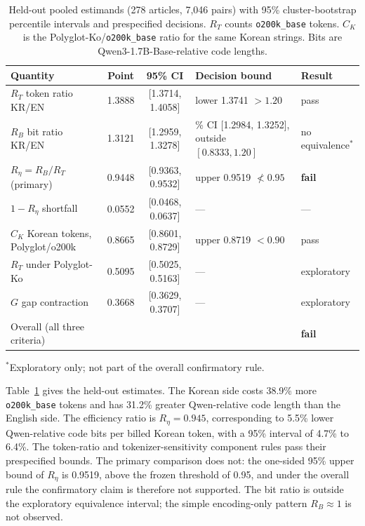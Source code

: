 \documentclass[11pt,a4paper]{article}
\newcommand{\RT}{R_{T}}
\newcommand{\RB}{R_{B}}
\newcommand{\Reta}{R_{\eta}}
\newcommand{\CK}{C_{K}}
\begin{document}
\begin{table}[htbp]
\centering\small
\caption{Held-out pooled estimands (278 articles, 7{,}046 pairs) with 95\%
cluster-bootstrap percentile intervals and prespecified decisions.
$\RT$ counts \texttt{o200k\_base} tokens. $\CK$ is the
Polyglot-Ko/\texttt{o200k\_base} ratio for the same Korean strings.
Bits are Qwen3-1.7B-Base-relative code lengths.}
\label{tab:main}
\begin{tabularx}{\textwidth}{@{}>{\raggedright\arraybackslash}p{4.6cm}cc>{\raggedright\arraybackslash}Xl@{}}
\toprule
Quantity & Point & 95\% CI & Decision bound & Result \\
\midrule
$\RT$ token ratio KR/EN & 1.3888 & [1.3714, 1.4058] & lower 1.3741 $>1.20$ & pass \\
$\RB$ bit ratio KR/EN & 1.3121 & [1.2959, 1.3278] & 90\% CI [1.2984, 1.3252], outside $[0.8333, 1.20]$ & no equivalence$^\ast$ \\
$\Reta=\RB/\RT$ (primary) & 0.9448 & [0.9363, 0.9532] & upper 0.9519 $\not<0.95$ & \textbf{fail} \\
$1-\Reta$ shortfall & 0.0552 & [0.0468, 0.0637] & --- & --- \\
$\CK$ Korean tokens, Polyglot/o200k & 0.8665 & [0.8601, 0.8729] & upper 0.8719 $<0.90$ & pass \\
$\RT$ under Polyglot-Ko & 0.5095 & [0.5025, 0.5163] & --- & exploratory \\
$G$ gap contraction & 0.3668 & [0.3629, 0.3707] & --- & exploratory \\
\midrule
Overall (all three criteria) & & & & \textbf{fail} \\
\bottomrule
\end{tabularx}
\par\smallskip
\raggedright\footnotesize $^\ast$Exploratory only; not part of the overall
confirmatory rule.
\end{table}

Table~\ref{tab:main} gives the held-out estimates. The Korean side costs
38.9\% more \texttt{o200k\_base} tokens and has 31.2\% greater
Qwen-relative code length than the English side. The efficiency ratio is
$\Reta=0.945$, corresponding to 5.5\% lower Qwen-relative code bits per
billed Korean token, with a 95\% interval of 4.7\% to 6.4\%. The
token-ratio and tokenizer-sensitivity component rules pass their prespecified
bounds. The primary comparison does not:
the one-sided 95\% upper bound of $\Reta$ is 0.9519, above the frozen
threshold of 0.95, and under the overall rule the confirmatory claim is
therefore not supported. The bit ratio is outside the exploratory
equivalence interval; the simple encoding-only pattern $\RB\approx1$ is not
observed.
\end{document}
